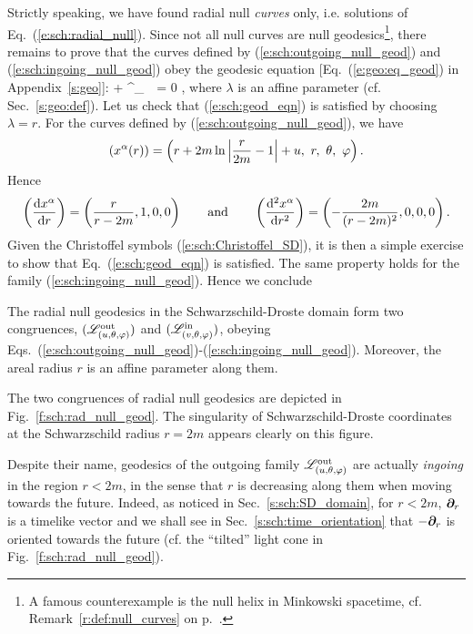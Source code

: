 Strictly speaking, we have found radial null \emph{curves} only, i.e. solutions of
Eq.~(\ref{e:sch:radial_null}). Since not all null curves
are null geodesics\footnote{A famous counterexample is the null helix in Minkowski
spacetime, cf. Remark~\ref{r:def:null_curves} on p.~\pageref{r:def:null_curves}.}, there remains to prove that the curves defined
by (\ref{e:sch:outgoing_null_geod}) and (\ref{e:sch:ingoing_null_geod})
obey the geodesic equation [Eq.~(\ref{e:geo:eq_geod}) in Appendix~\ref{s:geo}]:
\be \label{e:sch:geod_eqn}
     + \Gamma^\alpha_{\ \, \mu\nu}
          = 0 ,
\ee
where $\lambda$ is an affine parameter (cf. Sec.~\ref{s:geo:def}).
Let us check that (\ref{e:sch:geod_eqn}) is satisfied by choosing $\lambda=r$.
For the curves defined by (\ref{e:sch:outgoing_null_geod}), we have
\[
   \left( x^\alpha(r) \right) = \left( r + 2 m \ln \left| \frac{r}{2m} - 1 \right| + u,\ r,\  \theta,\  \varphi \right) .
\]
Hence
\[
    \left( \frac{\mathrm{d} x^\alpha}{\mathrm{d} r} \right) = \left( \frac{r}{r-2m}, 1, 0, 0 \right)
    \qquad\mbox{and}\qquad
    \left(  \frac{\mathrm{d}^2 x^\alpha}{\mathrm{d} r^2} \right) = \left( - \frac{2m}{(r-2m)^2}, 0, 0, 0 \right) .
\]
Given the Christoffel symbols (\ref{e:sch:Christoffel_SD}), it is then a
simple exercise to show that Eq.~(\ref{e:sch:geod_eqn}) is satisfied.
The same property holds for the family (\ref{e:sch:ingoing_null_geod}). Hence
we conclude
\begin{prop}
\label{p:sch:radial_null_geod}
The radial null geodesics in the Schwarzschild-Droste domain
form two congruences, $(\mathscr{L}^{\rm out}_{(u,\theta,\varphi)})$ and $(\mathscr{L}^{\rm in}_{(v,\theta,\varphi)})$,
obeying Eqs.~(\ref{e:sch:outgoing_null_geod})-(\ref{e:sch:ingoing_null_geod}).
Moreover, the areal radius $r$ is an affine parameter along them.
\end{prop}

The two congruences of radial null geodesics are depicted in
Fig.~\ref{f:sch:rad_null_geod}.
The singularity of Schwarzschild-Droste coordinates at
the Schwarzschild radius $r=2m$
appears clearly on this figure.


\begin{remark} \label{r:sch:outgoing_ingoing}
Despite their name, geodesics of the outgoing family $\mathscr{L}^{\rm out}_{(u,\theta,\varphi)}$ are actually
\emph{ingoing} in the region $r<2m$, in the sense that
$r$ is decreasing along them when moving towards the future. Indeed,
as noticed in Sec.~\ref{s:sch:SD_domain},
for $r<2m$, $\bm{\partial}_r$ is a timelike vector and we shall see in Sec.~\ref{s:sch:time_orientation}
that $-\bm{\partial}_r$ is oriented towards the future (cf. the ``tilted'' light cone
in Fig.~\ref{f:sch:rad_null_geod}).
\end{remark}

